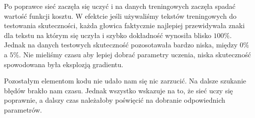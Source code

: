 Po poprawce sieć zaczęła się uczyć i na danych treningowych zaczęła spadać wartość funkcji kosztu. W efektcie jeśli
używaliśmy tekstów treningowych do testowania skuteczności, każda głowica faktycznie najlepiej przewidywała
znaki dla tekstu na którym się uczyła i szybko dokładność wynosiła blisko $100\%$. Jednak na danych testowych 
skuteczność pozosotawała bardzo niska, między $0\%$ a $5\%$. Nie mieliśmy czasu aby lepiej dobrać parametry uczenia,
niska skuteczność spowodowana była eksplozją gradientu. 

Pozostałym elementom kodu nie udało nam się nic zarzucić. Na dalsze szukanie błędów brakło nam czasu. 
Jednak wszystko wskazuje na to, że sieć uczy się poprawnie, a dalszy czas należałoby poświęcić na dobranie odpowiednich
parametrów.
